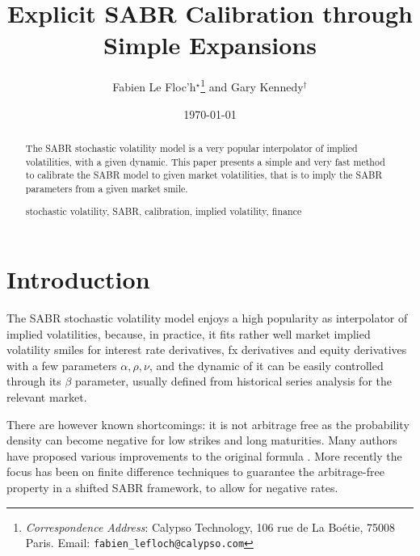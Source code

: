 \documentclass[]{rAMF2e}
\begin{document}
\doi{}
\issn{}  \issnp{}
\def\jobtag{}
\jname{}


\title{Explicit SABR Calibration through Simple Expansions}
\author{Fabien {Le Floc'h}$^\star$\thanks{{\em{Correspondence Address}}: Calypso Technology, 106 rue de La Bo\'{e}tie, 75008 Paris. Email: \texttt{fabien\_lefloch@calypso.com} \vspace{6pt}} and Gary Kennedy$^\dag$}
%
\date{\today}

\maketitle
\newcommand{\sgn}{\mathop{\mathrm{sgn}}}
\begin{abstract}
The SABR stochastic volatility model is a very popular interpolator of implied volatilities, with a given dynamic. This paper presents a simple and very fast method to calibrate the SABR model to given market volatilities, that is to imply the SABR parameters from a given market smile.
\begin{keywords}stochastic volatility, SABR, calibration, implied volatility, finance\end{keywords}
\end{abstract}

\section{Introduction}
The SABR stochastic volatility model \citep{hagan2002managing} enjoys a high popularity as interpolator of implied volatilities, because, in practice, it fits rather well market implied volatility smiles for interest rate derivatives, fx derivatives and equity derivatives with a few parameters $\alpha, \rho, \nu$, and the dynamic of it can be easily controlled through its $\beta$ parameter, usually defined from historical series analysis for the relevant market.

There are however known shortcomings: it is not arbitrage free as the probability density can become negative for low strikes and long maturities. Many authors have proposed various improvements to the original formula \citep{obloj2008fine, johnson2009arbitrage, paulot2009asymptotic, benaim2008arbitrage}. More recently the focus has been on finite difference techniques to guarantee the arbitrage-free property \citep{andreasen2011zabr, hagan2013arbitrage,lefloch2014fdmsabr} in a shifted SABR framework, to allow for negative rates. 
\end{document}
